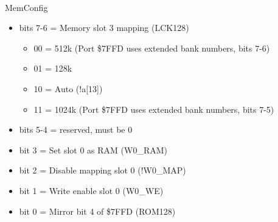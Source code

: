 \\
MemConfig
\begin{itemize}
\item bits 7-6 = Memory slot 3 mapping (LCK128)
  \begin{itemize}
  \item 00 = 512k (Port \$7FFD uses extended bank numbers, bits 7-6)
  \item 01 = 128k
  \item 10 = Auto (!a[13])
  \item 11 = 1024k (Port \$7FFD uses extended bank numbers, bits 7-5)
  \end{itemize}
\item bits 5-4 = reserved, must be 0
\item bit 3 = Set slot 0 as RAM (W0\_RAM)
\item bit 2 = Disable mapping slot 0 (!W0\_MAP)
\item bit 1 = Write enable slot 0 (W0\_WE)
\item bit 0 = Mirror bit 4 of \$7FFD (ROM128)
\end{itemize}

